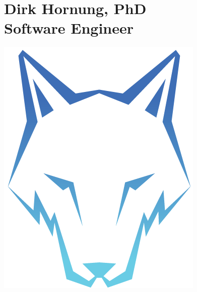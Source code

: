 \documentclass[11pt]{article}
\begin{document}
\begin{minipage}[t]{0.25\textwidth}
  \section*{Dirk Hornung, PhD \\
   Software Engineer}


  \includegraphics[width=\linewidth]{logo.png}




\end{minipage}
\end{document}
